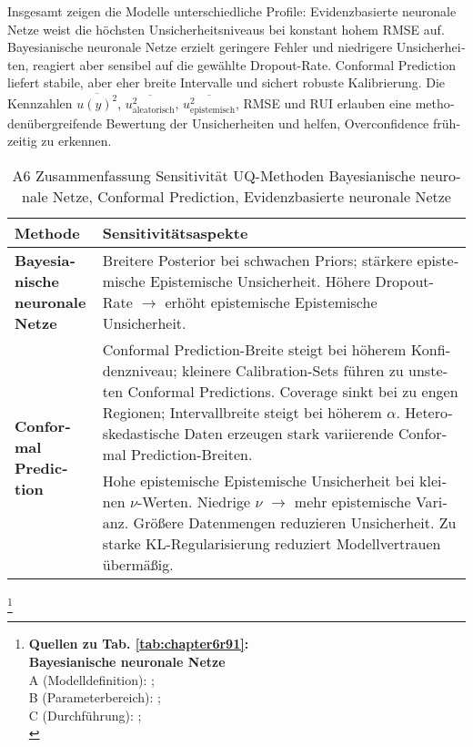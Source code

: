 \begin{otherlanguage}{ngerman}
Insgesamt zeigen die Modelle unterschiedliche Profile: \gls{Evidenzbasierte neuronale Netze} weist die höchsten Unsicherheitsniveaus bei konstant hohem RMSE auf. \gls{Bayesianische neuronale Netze} erzielt geringere Fehler und niedrigere Unsicherheiten, reagiert aber sensibel auf die gewählte Dropout-Rate. \gls{Conformal Prediction} liefert stabile, aber eher breite Intervalle und sichert robuste Kalibrierung. Die Kennzahlen \(\overline{u(y)^2}\), \(\overline{u_{\text{aleatorisch}}^2}\), \(\overline{u_{\text{epistemisch}}^2}\), RMSE und RUI erlauben eine methodenübergreifende Bewertung der Unsicherheiten und helfen, Overconfidence frühzeitig zu erkennen.



\begin{table}[!htbp]
\centering
\footnotesize
\begin{tabularx}{\textwidth}{|l|X|}
\hline
\textbf{Methode} & \hspace{0.0em}\textbf{Sensitivitätsaspekte} \\
\hline
\multirow{1}{*}{\textbf{\gls{Bayesianische neuronale Netze}}} &
Breitere Posterior bei schwachen Priors; stärkere \gls{epistemische Epistemische Unsicherheit}. Höhere Dropout-Rate \(\rightarrow\) erhöht \gls{epistemische Epistemische Unsicherheit}. \\
\hline
\multirow{2}{*}{\textbf{\gls{Conformal Prediction}}} &
\gls{Conformal Prediction}-Breite steigt bei höherem Konfidenzniveau; kleinere Calibration-Sets führen zu unsteten \gls{Conformal Prediction}s. Coverage sinkt bei zu engen Regionen; Intervallbreite steigt bei höherem \(\alpha\). Heteroskedastische Daten erzeugen stark variierende \gls{Conformal Prediction}-Breiten. \\
\hline
\multirow{2}{*}{\textbf{\gls{Evidenzbasierte neuronale Netze}}} &
Hohe \gls{epistemische Epistemische Unsicherheit} bei kleinen \(\nu\)-Werten. Niedrige \(\nu\) \(\rightarrow\) mehr epistemische Varianz. Größere Datenmengen reduzieren Unsicherheit. Zu starke KL-Regularisierung reduziert Modellvertrauen übermäßig. \\
\hline
\end{tabularx}
\caption{A6 Zusammenfassung Sensitivität UQ-Methoden \gls{Bayesianische neuronale Netze}, \gls{Conformal Prediction}, \gls{Evidenzbasierte neuronale Netze}}
\label{tab:sensitivity_r9_transposed}
\end{table}



\footnote{%
\begin{minipage}[t]{\textwidth}
\scriptsize
\textbf{Quellen zu Tab. \ref{tab:chapter6r91}:}\\[0.5em]
\textbf{\gls{Bayesianische neuronale Netze}}\\
A (Modelldefinition): \parencite[Kap.~3]{blundell2015weight}; \parencite[S.~40–42]{gal2016uncertainty} \\
B (Parameterbereich): \parencite[S.~448–450]{mackay1992practical}; \parencite[Kap.~5]{rasmussen2006gaussian} \\
C (Durchführung): \parencite[S.~41–42]{gal2016uncertainty}; \parencite{blundell2015weight} \\[0.5em]


\end{minipage}}
\end{otherlanguage}
